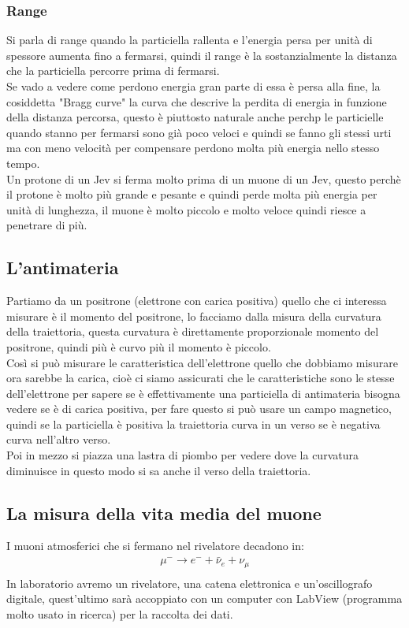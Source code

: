 \documentclass[a4paper, oneside]{article}
\begin{document}
\subsubsection{Range}
Si parla di range quando la particiella rallenta e l'energia persa per unità di spessore aumenta fino a fermarsi, quindi il range è la sostanzialmente la distanza che la particiella percorre prima di fermarsi.\\
Se vado a vedere come perdono energia gran parte di essa è persa alla fine, la cosiddetta "Bragg curve" la curva che descrive la perdita di energia in funzione della distanza percorsa, questo è piuttosto naturale anche perchp le particielle quando stanno per fermarsi sono già poco veloci e quindi se fanno gli stessi urti ma con meno velocità per compensare perdono molta più energia nello stesso tempo.\\ 
Un protone di un Jev si ferma molto prima di un muone di un Jev, questo perchè il protone è molto più grande e pesante e quindi perde molta più energia per unità di lunghezza, il muone è molto piccolo e molto veloce quindi riesce a penetrare di più.\\
\subsection{L'antimateria}
Partiamo da un positrone (elettrone con carica positiva) quello che ci interessa misurare è il momento del positrone, lo facciamo dalla misura della curvatura della traiettoria, questa curvatura è direttamente proporzionale momento del positrone, quindi più è curvo più il momento è piccolo.\\
Così si può misurare le caratteristica dell'elettrone quello che dobbiamo misurare ora sarebbe la carica, cioè ci siamo assicurati che le caratteristiche sono le stesse dell'elettrone per sapere se è effettivamente una particiella di antimateria bisogna vedere se è di carica positiva, per fare questo si può usare un campo magnetico, quindi se la particiella è positiva la traiettoria curva in un verso se è negativa curva nell'altro verso.\\
Poi in mezzo si piazza una lastra di piombo per vedere dove la curvatura diminuisce in questo modo si sa anche il verso della traiettoria.

\subsection{La misura della vita media del muone}
I muoni atmosferici che si fermano nel rivelatore decadono in:
\begin{gather*}
    \mu^- \rightarrow e^- + \bar{\nu}_e + \nu_\mu\\
\end{gather*}
In laboratorio avremo un rivelatore, una catena elettronica e un'oscillografo digitale, quest'ultimo sarà accoppiato con un computer con LabView (programma molto usato in ricerca) per la raccolta dei dati.\\
\end{document}
